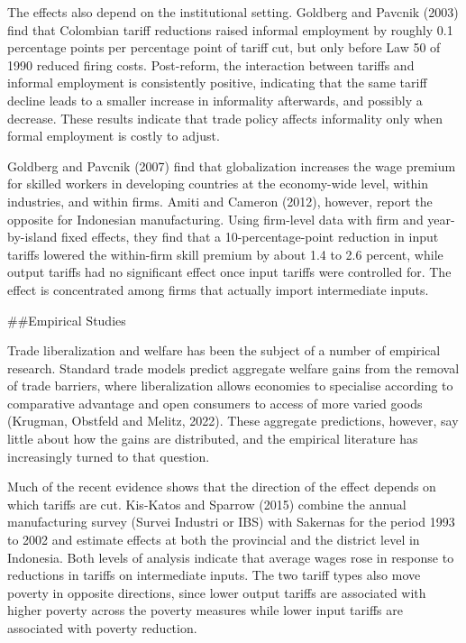 \documentclass[
  manuscript=article,
  layout=publish,
  year=2026,
  volume=1,
]{den}
\begin{document}
The effects also depend on the institutional setting. Goldberg and
Pavcnik (2003) find that Colombian tariff reductions raised informal
employment by roughly 0.1 percentage points per percentage point of
tariff cut, but only before Law 50 of 1990 reduced firing costs.
Post-reform, the interaction between tariffs and informal employment is
consistently positive, indicating that the same tariff decline leads to
a smaller increase in informality afterwards, and possibly a decrease.
These results indicate that trade policy affects informality only when
formal employment is costly to adjust.

Goldberg and Pavcnik (2007) find that globalization increases the wage
premium for skilled workers in developing countries at the economy-wide
level, within industries, and within firms. Amiti and Cameron (2012),
however, report the opposite for Indonesian manufacturing. Using
firm-level data with firm and year-by-island fixed effects, they find
that a 10-percentage-point reduction in input tariffs lowered the
within-firm skill premium by about 1.4 to 2.6 percent, while output
tariffs had no significant effect once input tariffs were controlled
for. The effect is concentrated among firms that actually import
intermediate inputs.

\#\#Empirical Studies

Trade liberalization and welfare has been the subject of a number of
empirical research. Standard trade models predict aggregate welfare
gains from the removal of trade barriers, where liberalization allows
economies to specialise according to comparative advantage and open
consumers to access of more varied goods (Krugman, Obstfeld and Melitz,
2022). These aggregate predictions, however, say little about how the
gains are distributed, and the empirical literature has increasingly
turned to that question.

Much of the recent evidence shows that the direction of the effect
depends on which tariffs are cut. Kis-Katos and Sparrow (2015) combine
the annual manufacturing survey (Survei Industri or IBS) with Sakernas
for the period 1993 to 2002 and estimate effects at both the provincial
and the district level in Indonesia. Both levels of analysis indicate
that average wages rose in response to reductions in tariffs on
intermediate inputs. The two tariff types also move poverty in opposite
directions, since lower output tariffs are associated with higher
poverty across the poverty measures while lower input tariffs are
associated with poverty reduction.
\end{document}
